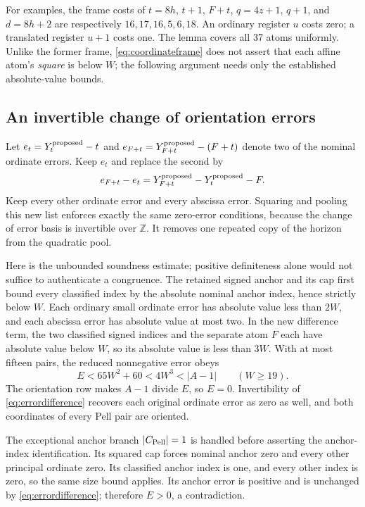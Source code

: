 \documentclass[11pt]{article}
\theoremstyle{remark}\newtheorem{remark}[theorem]{Remark}
\newcommand{\Z}{\mathbb Z}\newcommand{\N}{\mathbb N}
\begin{document}
For examples, the frame costs of $t=8h$, $t+1$, $F+t$, $q=4z+1$,
$q+1$, and $d=8h+2$ are respectively $16,17,16,5,6,18$.
An ordinary register $u$ costs zero; a translated register $u+1$ costs one.
The lemma covers all 37 atoms uniformly. Unlike the former frame,
\eqref{eq:coordinateframe} does not assert that each affine atom's
\emph{square} is below $W$; the following argument needs only the
established absolute-value bounds.

\subsection{An invertible change of orientation errors}

Let $e_t=Y_t^{\rm proposed}-t$ and
$e_{F+t}=Y_{F+t}^{\rm proposed}-(F+t)$ denote two of the nominal
ordinate errors. Keep $e_t$ and replace the second by
\begin{equation}\label{eq:errordifference}
              e_{F+t}-e_t
                 =Y_{F+t}^{\rm proposed}-Y_t^{\rm proposed}-F.
\end{equation}
Keep every other ordinate error and every abscissa error. Squaring and
pooling this new list enforces exactly the same zero-error conditions,
because the change of error basis is invertible over $\Z$. It removes
one repeated copy of the horizon from the quadratic pool.

Here is the unbounded soundness estimate; positive definiteness alone
would not suffice to authenticate a congruence. The retained signed
anchor and its cap first bound every classified index by the absolute
nominal anchor index, hence strictly below $W$. Each ordinary small
ordinate error has absolute value less than $2W$, and each abscissa
error has absolute value at most two. In the new difference term,
the two classified signed indices and the separate atom $F$ each
have absolute value below $W$, so its absolute value is less than
$3W$. With at most fifteen pairs, the reduced nonnegative error obeys
\[
       E<65W^2+60<4W^3<|A-1|\qquad(W\ge19).
\]
The orientation row makes $A-1$ divide $E$, so $E=0$. Invertibility
of \eqref{eq:errordifference} recovers each original ordinate error
as zero as well, and both coordinates of every Pell pair are oriented.

The exceptional anchor branch $|C_{\rm Pell}|=1$ is handled before
asserting the anchor-index identification. Its squared cap forces
nominal anchor zero and every other principal ordinate zero. Its
classified anchor index is one, and every other index is zero, so
the same size bound applies. Its anchor error is positive and is
unchanged by \eqref{eq:errordifference}; therefore $E>0$, a contradiction.
\end{document}
